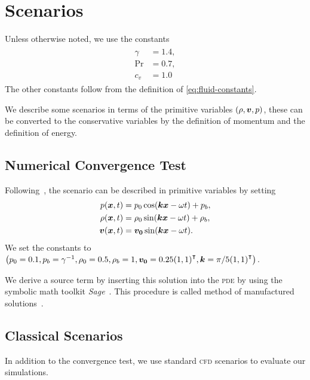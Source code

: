 \chapter{Scenarios}\label{sec:scenarios}
Unless otherwise noted, we use the constants
\begin{align}
\begin{split}
  \gamma &= 1.4, \\
  \Pr &= 0.7, \\
  c_v &= 1.0
\end{split}
\end{align}
The other constants follow from the definition of \cref{eq:fluid-constants}.

We describe some scenarios in terms of the primitive variables $(\rho, \bm{v}, p)$, these can be converted to the conservative variables by the definition of momentum and the definition of energy.   
\section{Numerical Convergence Test}
Following~\cite{dumbser2010arbitrary}, the scenario can be described in primitive variables by setting
\begin{align}
\begin{split}
  p(\bm{x}, t) &= p_0 \cos( \bm{k} \bm{x} - \omega t ) + p_b, \\
  \rho(\bm{x}, t) &= \rho_0 \sin (\bm{k} \bm{x} - \omega t) + \rho_b, \\
  \bm{v}(\bm{x}, t) &= \bm{v_0} \sin(\bm{k} \bm{x} - \omega t).
\end{split}
\end{align}
We set the constants to \( \left(  p_0 = 0.1, p_b = \gamma^{-1}, \rho_0 = 0.5, \rho_b = 1, 
\bm{v_0} = 0.25 {(1,1)}^\intercal, \bm{k} = \pi/5 {(1,1)}^\intercal \right) \).

We derive a source term by inserting this solution into the \textsc{pde} by using the symbolic math toolkit \textit{Sage}~\cite{sagemath}.
This procedure is called method of manufactured solutions~\cite{salari2000code}.

\section{Classical Scenarios}
In addition to the convergence test, we use standard \textsc{cfd} scenarios to evaluate our simulations.



